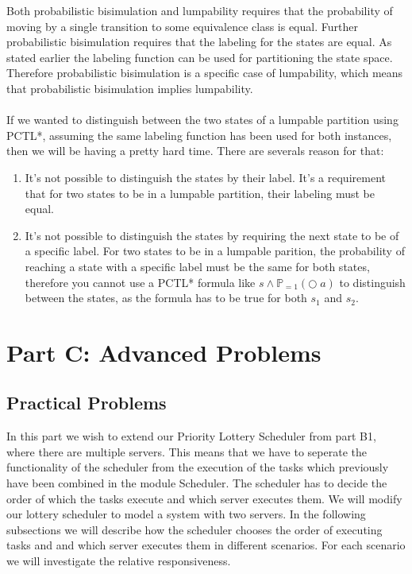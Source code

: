 \documentclass[12pt]{report}
\begin{document}
Both probabilistic bisimulation and lumpability requires that the probability of moving by a single transition to some equivalence class is equal. Further probabilistic bisimulation requires that the labeling for the states are equal. As stated earlier the labeling function can be used for partitioning the state space. Therefore probabilistic bisimulation is a specific case of lumpability, which means that probabilistic bisimulation implies lumpability.\\
\\
If we wanted to distinguish between the two states of a lumpable partition using PCTL*, assuming the same labeling function has been used for both instances, then we will be having a pretty hard time. There are severals reason for that:
\begin{enumerate}
	\item It's not possible to distinguish the states by their label. It's a requirement that for two states to be in a lumpable partition, their labeling must be equal.
	\item It's not possible to distinguish the states by requiring the next state to be of a specific label. For two states to be in a lumpable parition, the probability of reaching a state with a specific label must be the same for both states, therefore you cannot use a PCTL* formula like $s \wedge \mathbb{P}_{=1}(\bigcirc \; a)$ to distinguish between the states, as the formula has to be true for both $s_1$ and $s_2$.
\end{enumerate}


\chapter*{Part C: Advanced Problems}
\section*{Practical Problems}
In this part we wish to extend our Priority Lottery Scheduler from part B1, where there are multiple servers. This means that we have to seperate the functionality of the scheduler from the execution of the tasks which previously have been combined in the module Scheduler. The scheduler has to decide the order of which the tasks execute and which server executes them. We will modify our lottery scheduler to model a system with two servers. In the following subsections we will describe how the scheduler chooses the order of executing tasks and and which server executes them in different scenarios. For each scenario we will investigate the relative responsiveness.
\end{document}
